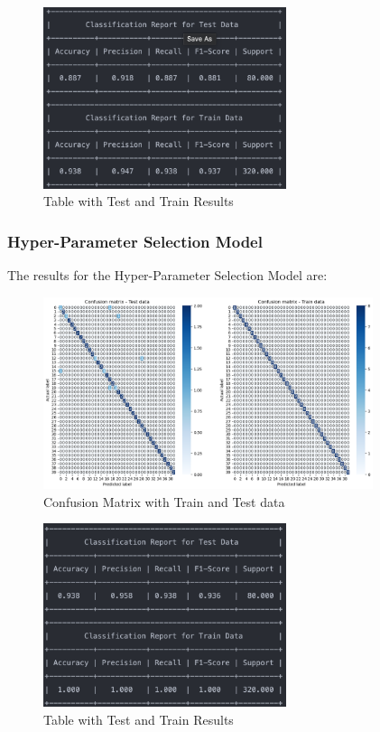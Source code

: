 \documentclass[conference]{IEEEtran}
\begin{document}
\begin{figure}[!h!]
    \includegraphics[width=2.8in]{k-NN/r_1.png}%
    \caption{Table with Test and Train Results}%
    \label{fig:conf_gnb_r_1}%
\end{figure}

\subsubsection{Hyper-Parameter Selection Model}

The results for the Hyper-Parameter Selection Model are:

\begin{figure}[!h!]
    \includegraphics[width=3.8in]{k-NN/2.png}%
    \caption{Confusion Matrix with Train and Test data}%
    \label{fig:conf_gnb_2}%
\end{figure}

\begin{figure}[!h!]
    \includegraphics[width=2.8in]{k-NN/r_2.png}%
    \caption{Table with Test and Train Results}%
    \label{fig:conf_gnb_r_2}%
\end{figure}
\end{document}
